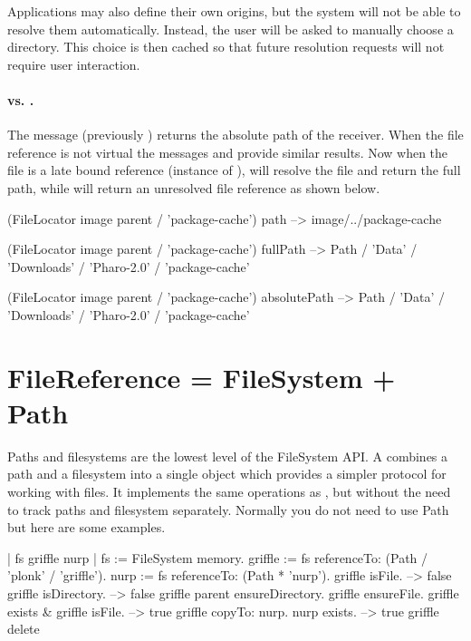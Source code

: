 \documentclass[a4paper,10pt,twoside]{book}
\begin{document}
Applications may also define their own origins, but the system will not be able to resolve them automatically. Instead, the user will be asked to manually choose a directory. This choice is then cached so that future resolution requests will not require user interaction.


\paragraph{ vs. .} The message   (previously ) returns the absolute path of the receiver. When the file reference is not virtual the messages  and  provide similar results.
Now when the file is a late bound reference (instance of ),  will resolve the file and return the full path, while  will return an unresolved file reference as shown below.


\begin{code}{}
(FileLocator image parent / 'package-cache') path
--> {image}/../package-cache

(FileLocator image parent / 'package-cache') fullPath
--> Path / 'Data' / 'Downloads' / 'Pharo-2.0' / 'package-cache'

(FileLocator image parent / 'package-cache') absolutePath
--> Path / 'Data' / 'Downloads' / 'Pharo-2.0' / 'package-cache'
\end{code}


\section{FileReference = FileSystem + Path}
Paths and filesystems are the lowest level of the FileSystem API. A  combines a path and a filesystem into a single object which provides a simpler protocol for working with files. It implements the same operations as , but without the need to track paths and filesystem separately.
Normally you do not need to use Path but here are some examples.

\begin{code}{}
| fs griffle nurp | 
fs := FileSystem memory.
griffle := fs referenceTo: (Path / 'plonk' / 'griffle').
nurp := fs referenceTo: (Path * 'nurp').
griffle isFile.	
    --> false			
griffle isDirectory. 		
    --> false		
griffle parent ensureDirectory.
griffle ensureFile.
griffle exists & griffle isFile.		
    --> true
griffle copyTo: nurp.
nurp exists.			
    --> true	
griffle delete       
\end{code}    
\end{document}
